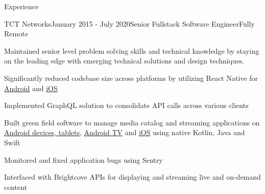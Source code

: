\documentclass{resume} %
\begin{document}
\begin{rSection}{Experience}
\begin{rSubsection}{TCT Networks}{January 2015 - July 2020}{Senior Fullstack Software Engineer}{Fully Remote}
\item Maintained senior level problem solving skills and technical knowledge by staying on the leading edge with emerging technical solutions and design techniques.
\item Significantly reduced codebase size across platforms by utilizing React Native for 
\href{https://play.google.com/store/apps/details?id=com.tcttv.tcttv&hl=en_US}{Android} and 
\href{https://apps.apple.com/us/app/tct-live-and-on-demand-tv/id376196467}{iOS} 
\item Implemented GraphQL solution to consolidate API calls across various clients
\item Built green field software to manage media catalog and streaming applications on \href{https://play.google.com/store/apps/details?id=com.tcttv.tcttv&hl=en_US}{Android devices, tablets}, \href{https://play.google.com/store/apps/details?id=com.tcttv.tv.android&hl=en_US}{Android TV} 
and 
\href{https://apps.apple.com/us/app/tct-live-and-on-demand-tv/id376196467}{iOS} using native Kotlin, Java and Swift
\item Monitored and fixed application bugs using Sentry
\item Interfaced with Brightcove APIs for displaying and streaming live and on-demand content
\end{rSubsection}



\end{rSection}
\end{document}
